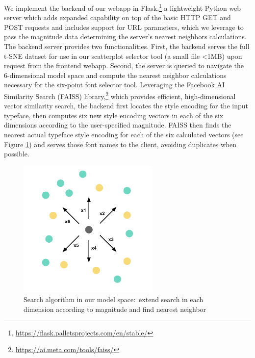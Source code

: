 We implement the backend of our webapp in Flask,\footnote{\url{https://flask.palletsprojects.com/en/stable/}} a lightweight Python web server which adds expanded capability on top of the basic HTTP GET and POST requests and includes support for URL parameters, which we leverage to pass the magnitude data determining the server's nearest neighbors calculations. The backend server provides two functionalities. First, the backend serves the full t-SNE dataset for use in our scatterplot selector tool (a small file <1MB) upon request from the frontend webapp. Second, the server is queried to navigate the 6-dimensional model space and compute the nearest neighbor calculations necessary for the six-point font selector tool. Leveraging the Facebook AI Similarity Search (FAISS) library,\footnote{\url{https://ai.meta.com/tools/faiss/}} which provides efficient, high-dimensional vector similarity search, the backend first locates the style encoding for the input typeface, then computes six new style encoding vectors in each of the six dimensions according to the user-specified magnitude. FAISS then finds the nearest actual typeface style encoding for each of the six calculated vectors (see Figure \ref{fig:model-search}) and serves those font names to the client, avoiding duplicates when possible.

\begin{figure}[]
    \centering
    \includegraphics[width=0.62\textwidth]{images/model-search.png}
    \caption{Search algorithm in our model space:\ extend search in each dimension according to magnitude and find nearest neighbor}
    \label{fig:model-search}
\end{figure}

